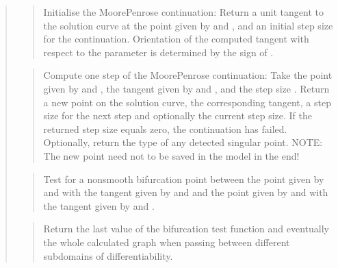 \documentclass[a4paper,11pt,english]{sphinxmanual}
\begin{document}
\begin{quote}
\begin{quote}
Initialise the Moore\sphinxhyphen{}Penrose continuation: Return a unit tangent to
the solution curve at the point given by  and ,
and an initial step size for the continuation. Orientation of the
computed tangent with respect to the parameter is determined by the
sign of .
\end{quote}

\begin{quote}

Compute one step of the Moore\sphinxhyphen{}Penrose continuation: Take the point
given by  and , the tangent given by 
and , and the step size . Return a new point on the
solution curve, the corresponding tangent, a step size for the next
step and optionally the current step size. If the returned step
size equals zero, the continuation has failed. Optionally, return
the type of any detected singular point.
NOTE: The new point need not to be saved in the model in the end!
\end{quote}

\begin{quote}

Test for a non\sphinxhyphen{}smooth bifurcation point between the point given by
 and  with the tangent given by 
and  and the point given by  and 
with the tangent given by  and .
\end{quote}

\begin{quote}

Return the last value of the bifurcation test function and eventually
the whole calculated graph when passing between different sub\sphinxhyphen{}domains
of differentiability.
\end{quote}


\end{quote}
\end{document}
